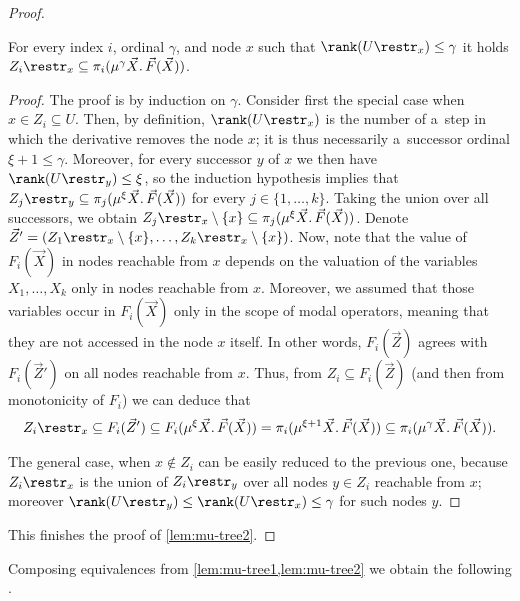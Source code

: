\begin{proof}
	\begin{clm}
		For every index $i$, ordinal $\gamma$, and node $x$ such that $\rank(U\restr_x)\leq\gamma$ it holds $Z_i\restr_x\subseteq\pi_i(\mu^\gamma\vec{X}.\,\vec{F}(\vec{X}))$.
	\end{clm}

	\begin{proof}
		The proof is by induction on $\gamma$.
		Consider first the special case when $x\in Z_i\subseteq U$.
		Then, by definition, $\rank(U\restr_x)$ is the number of a~step in which the derivative removes the node $x$; it is thus necessarily a~successor ordinal $\xi+1\leq\gamma$.
		Moreover, for every successor $y$ of $x$ we then have $\rank(U\restr_y)\leq\xi$,
		so the induction hypothesis implies that $Z_j\restr_y\subseteq\pi_j(\mu^{\xi}\vec{X}.\,\vec{F}(\vec{X}))$ for every $j\in\{1,\dots,k\}$.
		Taking the union over all successors, we obtain $Z_j\restr_x\setminus\{x\}\subseteq\pi_j(\mu^{\xi}\vec{X}.\,\vec{F}(\vec{X}))$.
		Denote $\vec{Z}'=(Z_1\restr_x\setminus\{x\},\dots,Z_k\restr_x\setminus\{x\})$.
		Now, note that the value of $F_i(\vec{X})$ in nodes reachable from $x$ depends on the valuation of the variables $X_1,\dots,X_k$ only in nodes reachable from $x$.
		Moreover, we assumed that those variables occur in $F_i(\vec{X})$ only in the scope of modal operators, meaning that they are not accessed in the node $x$ itself.
		In other words, $F_i(\vec{Z})$ agrees with $F_i(\vec{Z}')$ on all nodes reachable from $x$.
		Thus, from $Z_i\subseteq F_i(\vec{Z})$ (and then from monotonicity of $F_i$) we can deduce that
		\begin{align*}
			Z_i\restr_x\subseteq F_i(\vec{Z}')\subseteq F_i(\mu^{\xi}\vec{X}.\,\vec{F}(\vec{X}))=\pi_i(\mu^{\xi+1}\vec{X}.\,\vec{F}(\vec{X}))\subseteq\pi_i(\mu^\gamma\vec{X}.\,\vec{F}(\vec{X})).
		\end{align*}
		
		The general case, when $x\not\in Z_i$ can be easily reduced to the previous one,
		because $Z_i\restr_x$ is the union of $Z_i\restr_y$ over all nodes $y\in Z_i$ reachable from $x$;
		moreover $\rank(U\restr_y)\leq\rank(U\restr_x)\leq\gamma$ for such nodes $y$.
	\end{proof}

	This finishes the proof of \cref{lem:mu-tree2}.
\end{proof}

Composing equivalences from \cref{lem:mu-tree1,lem:mu-tree2} we obtain the following .

